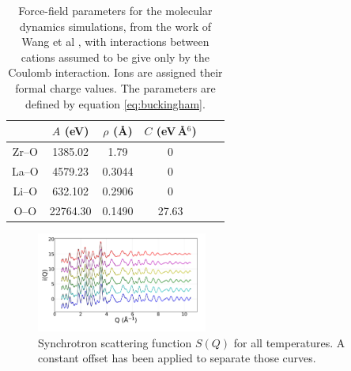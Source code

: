 \documentclass[twoside,twocolumn,9pt]{article}
\begin{document}

\begin{table}[t]
\centering
\caption{Force-field parameters for the molecular dynamics simulations, from the work of Wang et al \cite{Wang:2014ic}, with interactions between cations assumed to be give only by the Coulomb interaction. Ions are assigned their formal charge values. The parameters are defined by equation \ref{eq:buckingham}.} \label{tab:md_force}
\begin{tabular}{cccccc}
\hline
      & $A$ (eV)  & $\rho$ (\AA) & $C$ (eV\,\AA$^6$)           \\
\hline
Zr--O  & 1385.02 & 1.79        & 0                      \\
La--O  & 4579.23 & 0.3044      & 0                      \\
Li--O  & 632.102 & 0.2906      & 0                      \\
O--O   & 22764.30& 0.1490      & 27.63                  \\
\hline
\end{tabular}
\end{table}

\begin{figure}[t]
\centering
\includegraphics[width=0.5\textwidth]{Pics/xsoq.pdf}
\caption{Synchrotron scattering function $S(Q)$ for all temperatures. A constant offset has been applied to separate those curves.}
\label{fig:xsoq}
\end{figure}
\end{document}
